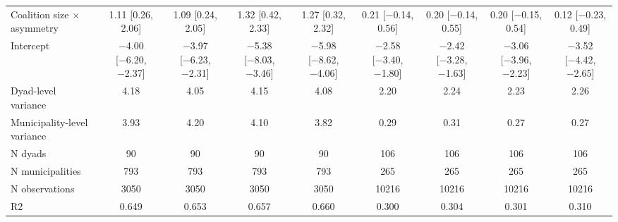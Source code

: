 \begin{tabular}{lcccc|cccc}
Coalition size × asymmetry   & \num{1.11} [\num{0.26}, \num{2.06}]    & \num{1.09} [\num{0.24}, \num{2.05}]    & \num{1.32} [\num{0.42}, \num{2.33}]    & \num{1.27} [\num{0.32}, \num{2.32}]    & \num{0.21} [\num{-0.14}, \num{0.56}]   & \num{0.20} [\num{-0.14}, \num{0.55}]   & \num{0.20} [\num{-0.15}, \num{0.54}]   & \num{0.12} [\num{-0.23}, \num{0.49}]   \\
Intercept                                & \num{-4.00} [\num{-6.20}, \num{-2.37}] & \num{-3.97} [\num{-6.23}, \num{-2.31}] & \num{-5.38} [\num{-8.03}, \num{-3.46}] & \num{-5.98} [\num{-8.62}, \num{-4.06}] & \num{-2.58} [\num{-3.40}, \num{-1.80}] & \num{-2.42} [\num{-3.28}, \num{-1.63}] & \num{-3.06} [\num{-3.96}, \num{-2.23}] & \num{-3.52} [\num{-4.42}, \num{-2.65}] \\
\midrule
Dyad-level variance                          & \num{4.18}                               & \num{4.05}                               & \num{4.15}                               & \num{4.08}                               & \num{2.20}                               & \num{2.24}                               & \num{2.23}                               & \num{2.26}                               \\
Municipality-level variance                  & \num{3.93}                               & \num{4.20}                               & \num{4.10}                               & \num{3.82}                               & \num{0.29}                               & \num{0.31}                               & \num{0.27}                               & \num{0.27}                               \\
N dyads  & \num{90} & \num{90}  & \num{90} & \num{90} & \num{106} & \num{106} & \num{106} & \num{106} \\
N municipalities & \num{793} & \num{793} & \num{793} & \num{793} & \num{265} & \num{265}  & \num{265} & \num{265} \\
N observations                                     & \num{3050}                               & \num{3050}                               & \num{3050}                               & \num{3050}                               & \num{10216}                              & \num{10216}                              & \num{10216}                              & \num{10216}                              \\
R2                                           & \num{0.649}                              & \num{0.653}                              & \num{0.657}                              & \num{0.660}                              & \num{0.300}                              & \num{0.304}                              & \num{0.301}                              & \num{0.310}                              \\

\end{tabular}
